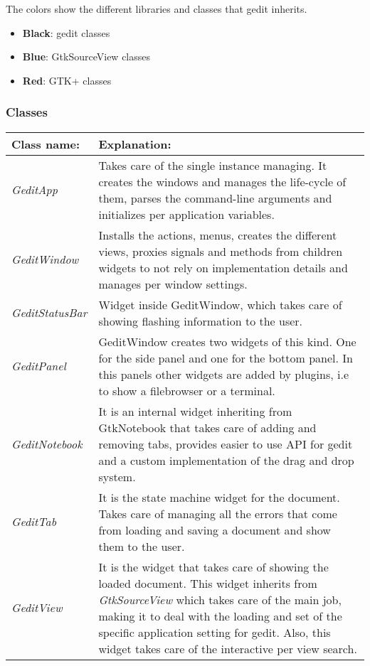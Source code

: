 The colors show the different libraries and classes that gedit inherits.
\begin{itemize}
  \item \textbf{Black}: gedit classes
  \item \textbf{Blue}: GtkSourceView classes
  \item \textbf{Red}: GTK+ classes
\end{itemize}

\newpage
\subsubsection{Classes}

\begin{table}[H]
  \begin{center}
    \begin{tabularx}{\textwidth}{|l|X|}
      \firsthline
      \textbf{Class name:} & \textbf{Explanation:} \\
      \hline
      \textit{GeditApp} & Takes care of the single instance managing. It creates the windows and manages the life-cycle of them, parses the command-line arguments and initializes per application variables. \\
      \hline
      \textit{GeditWindow} & Installs the actions, menus, creates the different views, proxies signals and methods from children widgets to not rely on implementation details and manages per window settings. \\
      \hline
      \textit{GeditStatusBar} & Widget inside GeditWindow, which takes care of showing flashing information to the user. \\
      \hline
      \textit{GeditPanel} & GeditWindow creates two widgets of this kind. One for the side panel and one for the bottom panel. In this panels other widgets are added by plugins, i.e to show a filebrowser or a terminal. \\
      \hline
      \textit{GeditNotebook} & It is an internal widget inheriting from GtkNotebook that takes care of adding and removing tabs, provides easier to use API for gedit and a custom implementation of the drag and drop system. \\
      \hline
      \textit{GeditTab} & It is the state machine widget for the document. Takes care of managing all the errors that come from loading and saving a document and show them to the user. \\
      \hline
      \textit{GeditView} & It is the widget that takes care of showing the loaded document. This widget inherits from \emph{GtkSourceView} which takes care of the main job, making it to deal with the loading and set of the specific application setting for gedit. Also, this widget takes care of the interactive per view search. \\

\end{tabularx}
\end{center}
\end{table}
